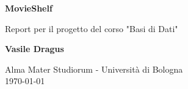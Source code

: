 \begin{titlepage}
  \begin{center}
    \vspace*{1cm}

    {\fontsize{40pt}{40pt}\selectfont\bfseries MovieShelf}

    \vspace{0.5cm}
      Report per il progetto del corso "Basi di Dati"
    \vspace{1.5cm}

    \textbf{Vasile Dragus}

    \vfill
         
    \vspace{0.8cm}
      Alma Mater Studiorum - Università di Bologna \\
    \vspace{0.5cm}
    \today
  \end{center}
\end{titlepage}